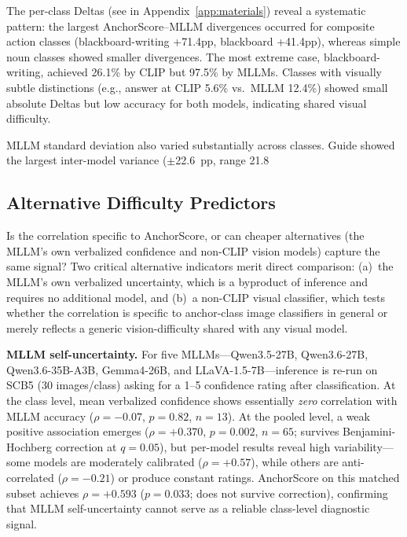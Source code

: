 \documentclass[11pt,a4paper]{article}
\begin{document}
The per-class Deltas (see  in Appendix~\ref{app:materials}) reveal a systematic pattern: the largest AnchorScore--MLLM divergences occurred for composite action classes (blackboard-writing +71.4pp, blackboard +41.4pp), whereas simple noun classes showed smaller divergences. The most extreme case, blackboard-writing, achieved 26.1\% by CLIP but 97.5\% by MLLMs. Classes with visually subtle distinctions (e.g., answer at CLIP 5.6\% vs.\ MLLM 12.4\%) showed small absolute Deltas but low accuracy for both models, indicating shared visual difficulty.

MLLM standard deviation also varied substantially across classes. Guide showed the largest inter-model variance ($\pm$22.6~pp, range 21.8%

\subsection{Alternative Difficulty Predictors}
\label{sec:extended_baselines}

Is the correlation specific to AnchorScore, or can cheaper alternatives (the MLLM's own verbalized confidence and non-CLIP vision models) capture the same signal? Two critical alternative indicators merit direct comparison: (a)~the MLLM's own verbalized uncertainty, which is a byproduct of inference and requires no additional model, and (b)~a non-CLIP visual classifier, which tests whether the correlation is specific to anchor-class image classifiers in general or merely reflects a generic vision-difficulty shared with any visual model.

\textbf{MLLM self-uncertainty.} For five MLLMs---Qwen3.5-27B, Qwen3.6-27B, Qwen3.6-35B-A3B, Gemma4-26B, and LLaVA-1.5-7B---inference is re-run on SCB5 (30 images/class) asking for a 1--5 confidence rating after classification. At the class level, mean verbalized confidence shows essentially \emph{zero} correlation with MLLM accuracy ($\rho=-0.07$, $p=0.82$, $n=13$). At the pooled level, a weak positive association emerges ($\rho=+0.370$, $p=0.002$, $n=65$; survives Benjamini-Hochberg correction at $q=0.05$), but per-model results reveal high variability---some models are moderately calibrated ($\rho=+0.57$), while others are anti-correlated ($\rho=-0.21$) or produce constant ratings. AnchorScore on this matched subset achieves $\rho=+0.593$ ($p=0.033$; does not survive correction), confirming that MLLM self-uncertainty cannot serve as a reliable class-level diagnostic signal.
\end{document}
